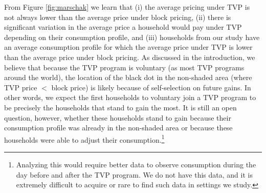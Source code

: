 From Figure \ref{fig:marschak} we learn that (i) the average pricing under TVP is not always lower than the average price under block pricing, (ii) there is significant variation in the average price a household would pay under TVP depending on their consumption profile, and (iii) households from our study have an average consumption profile for which the average price under TVP is lower than the average price under block pricing. As discussed in the introduction, we believe that because the TVP program is voluntary (as most TVP programs around the world), the location of the black dot in the non-shaded area (where TVP price $<$ block price) is likely because of self-selection on future gains. In other words, we expect the first households to voluntary join a TVP program to be precisely the households that stand to gain the most. It is still an open question, however, whether these households stand to gain because their consumption profile was already in the non-shaded area or because these households were able to adjust their consumption.\footnote{Analyzing this would require better data to observe consumption during the day before and after the TVP program. We do not have this data, and it is extremely difficult to acquire or rare to find such data in settings we study.}

\FloatBarrier

